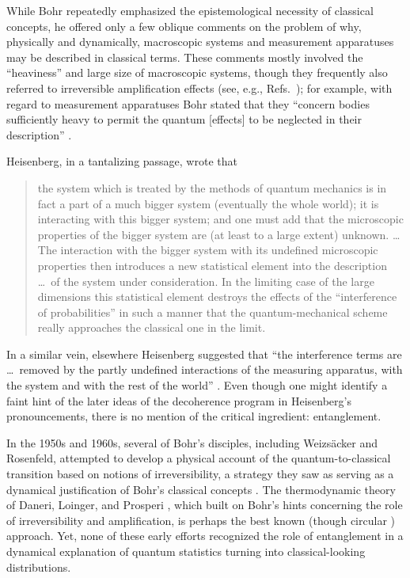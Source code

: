\documentclass[3p,sort&compress,12pt]{elsarticle}
\begin{document}
While Bohr repeatedly emphasized the epistemological necessity of classical concepts, he offered only a few oblique comments on the problem of why, physically and dynamically, macroscopic systems and measurement apparatuses may be described in classical terms. These comments mostly involved the ``heaviness'' and large size of macroscopic systems, though they frequently also referred to irreversible amplification effects (see, e.g., Refs.~\cite{Bohr:1958:lu,Bohr:1958:mj}); for example, with regard to measurement apparatuses Bohr stated that they ``concern bodies sufficiently heavy to permit the quantum [effects] to be neglected in their description'' \cite[p.~170]{Bohr:1958:lu}.

Heisenberg, in a tantalizing passage, wrote that \cite[pp.~121--2]{Heisenberg:1989:zb}
%
\begin{quote}
  the system which is treated by the methods of quantum mechanics is in fact a part of a much bigger system (eventually the whole world); it is interacting with
  this bigger system; and one must add that the microscopic properties of the bigger system are (at least to a large extent) unknown. \dots The interaction with the bigger system with its undefined microscopic properties then introduces a new statistical element into the description \dots\ of the system under
  consideration. In the limiting case of the large dimensions this statistical element destroys the effects of the ``interference of probabilities'' in such a manner that the quantum-mechanical scheme really approaches the classical one in the limit.
\end{quote}
%
In a similar vein, elsewhere Heisenberg suggested that ``the interference terms are \dots\ removed by the partly undefined interactions of the measuring apparatus, with the system and with the rest of the world'' \cite[p.~23]{Heisenberg:1955:lm}. Even though one might identify a faint hint of the later ideas of the decoherence program in Heisenberg's pronouncements, there is no mention of the critical ingredient: entanglement. 

In the 1950s and 1960s, several of Bohr's disciples, including Weizs\"acker and Rosenfeld, attempted to develop a physical account of the quantum-to-classical transition based on notions of irreversibility, a strategy they saw as serving as a dynamical justification of Bohr's classical concepts \cite{Camilleri:2015:oo}. The thermodynamic theory of Daneri, Loinger, and Prosperi \cite{Daneri:1962:om}, which built on Bohr's hints concerning the role of irreversibility and amplification, is perhaps the best known (though circular \cite{Wigner:1995:jm, Bub:1971:ll}) approach. Yet, none of these early efforts recognized the role of entanglement in a dynamical explanation of quantum statistics turning into classical-looking distributions.
\end{document}
